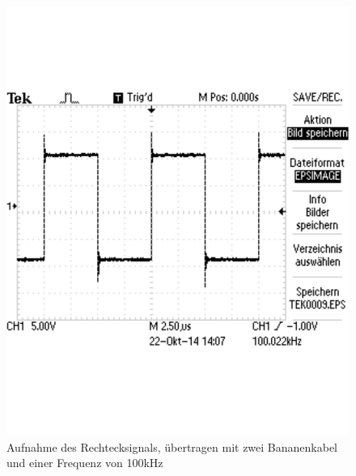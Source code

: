 \documentclass[12pt,a4paper]{article}
\begin{document}
\begin{figure}[H] 
  \centering
    \includegraphics[scale = 0.4]{2_3_vgl_2.pdf}
  	\caption[Aufnahme des Rechtecksignals, übertragen mit zwei Bananenkabel und einer Frequenz von 100kHz]{Aufnahme des Rechtecksignals, übertragen mit zwei Bananenkabel und einer Frequenz von 100kHz}
  \label{fig:2_3_vgl_2}
\end{figure}
\end{document}
